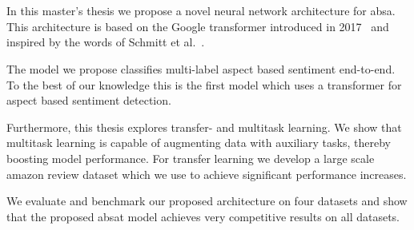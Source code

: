 \chapter{\abstractname}

In this master's thesis we propose a novel neural network architecture for \acrfull{absa}. This architecture is based on the Google transformer introduced in 2017~\cite{Vaswani2017} and inspired by the words of Schmitt et al.~\cite{Schmitt2018}.
\medskip

The model we propose classifies multi-label aspect based sentiment end-to-end. To the best of our knowledge this is the first model which uses a transformer for aspect based sentiment detection.
\medskip

Furthermore, this thesis explores transfer- and multitask learning. We show that multitask learning is capable of augmenting data with auxiliary tasks, thereby boosting model performance. For transfer learning we develop a large scale amazon review dataset which we use to achieve significant performance increases.
\medskip

We evaluate and benchmark our proposed architecture on four datasets and show that the proposed \acrfull{absat} model achieves very competitive results on all datasets.


